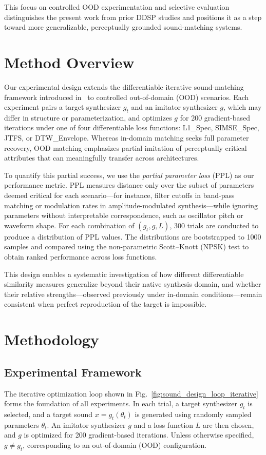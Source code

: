 \documentclass[runningheads]{llncs}
\providecommand{\gls}[1]{#1}
\begin{document}
This focus on controlled OOD experimentation and selective evaluation distinguishes the present work from prior DDSP studies and positions it as a step toward more generalizable, perceptually grounded sound-matching systems.


\section{Method Overview}
\label{sec:method_overview}

Our experimental design extends the differentiable iterative sound-matching framework introduced in~\cite{salimi2025evaluating} to controlled out-of-domain (OOD) scenarios.  
Each experiment pairs a target synthesizer $g_t$ and an imitator synthesizer $g$, which may differ in structure or parameterization, and optimizes $g$ for 200 gradient-based iterations under one of four differentiable loss functions: L1\_Spec, SIMSE\_Spec, JTFS, or DTW\_Envelope.  
Whereas in-domain matching seeks full parameter recovery, OOD matching emphasizes partial imitation of perceptually critical attributes that can meaningfully transfer across architectures.  

To quantify this partial success, we use the \textit{partial parameter loss} (PPL) as our performance metric.  
PPL measures distance only over the subset of parameters deemed critical for each scenario—for instance, filter cutoffs in band-pass matching or modulation rates in amplitude-modulated synthesis—while ignoring parameters without interpretable correspondence, such as oscillator pitch or waveform shape.  
For each combination of $(g_t, g, L)$, 300 trials are conducted to produce a distribution of PPL values.  
The distributions are bootstrapped to 1000 samples and compared using the non-parametric Scott–Knott (\gls{NPSK}) test to obtain ranked performance across loss functions.  

This design enables a systematic investigation of how different differentiable similarity measures generalize beyond their native synthesis domain, and whether their relative strengths—observed previously under in-domain conditions—remain consistent when perfect reproduction of the target is impossible.

 \section{Methodology}
\label{sec:experiment_setup}

\subsection{Experimental Framework}
The iterative optimization loop shown in Fig.~\ref{fig:sound_design_loop_iterative} forms the foundation of all experiments.  
In each trial, a target synthesizer $g_t$ is selected, and a target sound $x = g_t(\theta_t)$ is generated using randomly sampled parameters $\theta_t$.  
An imitator synthesizer $g$ and a loss function $L$ are then chosen, and $g$ is optimized for 200 gradient-based iterations.  
Unless otherwise specified, $g \neq g_t$, corresponding to an out-of-domain (OOD) configuration.
\end{document}
